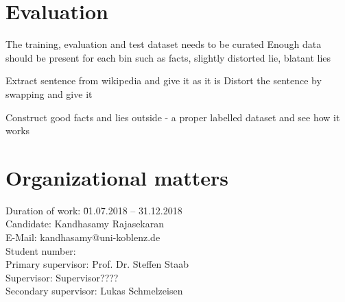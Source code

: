 \documentclass[a4paper, 11pt]{article}
\makeatletter
\newcommand{\myName}{Kandhasamy Rajasekaran}
\newcommand{\emailID}{kandhasamy@uni-koblenz.de}
\newcommand{\matriculationID}{216100855}
\newcommand{\StartDate}{01.07.2018}
\newcommand{\EndDate}{31.12.2018}
\newcommand{\expert}{Prof. Dr. Steffen Staab}%
\newcommand{\supervisor}{Supervisor????} %
\newcommand{\scndSupervisor}{Lukas Schmelzeisen} %
\makeatother
\begin{document}





\section{Evaluation}

The training, evaluation and test dataset needs to be curated
Enough data should be present for each bin such as facts, slightly distorted lie, blatant lies 

Extract sentence from wikipedia and give it as it is
Distort the sentence by swapping and give it 

Construct good facts and lies outside - a proper labelled dataset and see how it works
\newpage

\section{Organizational matters}

\begin{tabbing}
Duration of work: \hspace{1.1cm} \= \StartDate{} -- \EndDate{}\\
\vspace{0.5ex}Candidate:	\> \myName{}\\
\vspace{0.5ex}E-Mail:	\> \emailID{}\\
\vspace{0.5ex}Student number: \> \matriculationID{}\\
\vspace{0.5ex}Primary supervisor: \> \expert{}\\
Supervisor: \> \supervisor{}\\
Secondary supervisor: \> \scndSupervisor{}\\
\end{tabbing}
\end{document}
